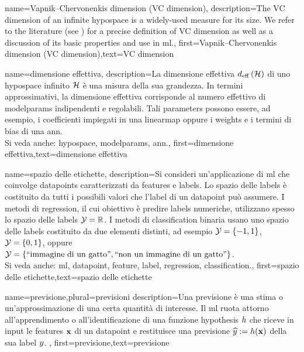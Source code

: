 {name={Vapnik–Chervonenkis dimension (VC dimension)},
	description={The VC dimension of an infinite \gls{hypospace} is a widely-used measure 
		for its size. We refer to the literature (see \cite{ShalevMLBook}) for a precise definition of VC dimension 
		as well as a discussion of its basic properties and use in \gls{ml}.},
	first={Vapnik–Chervonenkis dimension (VC dimension)},text={VC dimension}  
}

{name={dimensione effettiva},
	description={La dimensione effettiva $d_{\rm eff} \left( \mathcal{H} \right)$ di  
		uno \gls{hypospace} infinito $\mathcal{H}$ è una misura della sua grandezza. In termini approssimativi, la dimensione effettiva 
		corrisponde al numero effettivo di \gls{modelparams} indipendenti e regolabili.
		Tali \glspl{parameter} possono essere, ad esempio, i coefficienti impiegati in una \gls{linearmap} oppure i \gls{weights} e i 
		termini di bias di una \gls{ann}.		
					\\ 
		Si veda anche: \gls{hypospace}, \gls{modelparams}, \gls{ann}.},
	first={dimensione effettiva},text={dimensione effettiva}  
}

{name={spazio delle etichette},
	description={Si consideri un'applicazione di \gls{ml} che coinvolge \glspl{datapoint} caratterizzati da 
	\glspl{feature} e \glspl{label}. Lo spazio delle \glspl{label} è costituito da tutti i possibili valori che l'\gls{label} 
		di un \gls{datapoint} può assumere. I metodi di \gls{regression}, il cui obiettivo è predire \glspl{label} numeriche, 
		 utilizzano spesso lo spazio delle \glspl{label} $\mathcal{Y} = \mathbb{R}$. I metodi di \gls{classification} binaria usano uno 
		 spazio delle \glspl{label} costituito da due elementi distinti, ad esempio $\mathcal{Y} =\{-1,1\}$, $\mathcal{Y}=\{0,1\}$, 
		oppure $\mathcal{Y} = \{ \mbox{``immagine di un gatto''}, \mbox{``non un immagine di un gatto''} \}$.
					\\ 
		Si veda anche: \gls{ml}, \gls{datapoint}, \gls{feature}, \gls{label}, \gls{regression}, \gls{classification}.}, first={spazio delle etichette},text={spazio delle etichette}  
}

{name={previsione},plural={previsioni}
	description={Una previsione è una stima o un'approssimazione di una certa quantità di interesse.
		Il \gls{ml} ruota attorno all'apprendimento o all'identificazione di una funzione \gls{hypothesis} $h$ 
		che riceve in input le \glspl{feature} ${\bf x}$ di un \gls{datapoint} e restituisce una previsione 
		$\widehat{y} := h({\bf x})$ della sua \gls{label} $y$. },
	first={previsione},text={previsione}  
}


